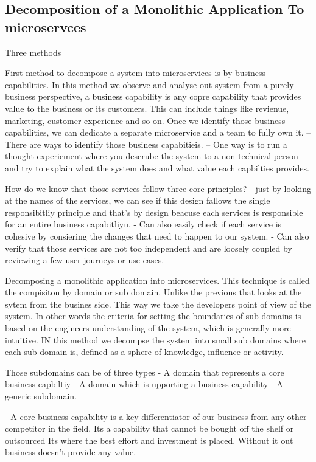 \documentclass[a4paper, 11pt]{book}
\begin{document}
{    \subsection{Decomposition of a Monolithic Application To microservces}
    Three methods

    First method to decompose a system into microservices is by business capabilities.
    In this method we observe and analyse out system from a purely business perspective, a business capability is any copre capability that provides value to the business or its customers.
    This can include things like revienue, marketing, customer experience and so on.
    Once we identify those business capabilities, we can dedicate a separate microservice and a team to fully own it.
    -- There are ways to identify those business capabitieis.
    -- One way is to run a thought experiement where you descrube the system to a non technical person and try to explain what the system does and what value each capbilties provides.

    How do we know that those services follow three core principles?
    - just by looking at the names of the services, we can see if this design fallows the single responsibitliy principle
    and that's by design beacuse each services is responsible for an entire business capabitliyu.
    - Can also easily check if each service is cohesive by consiering the changes that need to happen to our system.
    - Can also verify that those services are not too independent and are loosely coupled by reviewing a few user journeys or use cases.

    Decomposing a monolithic application into microservices.
    This technique is called the compisiton by domain or sub domain.
    Unlike the previous that looks at the sytem from the busines side.
    This way we take the developers point of view of the system.
    In other words the criteria for setting the boundaries of sub domains is based on the engineers understanding of the system, which is generally more intuitive.
    IN this method we decompse the system into small sub domains where each sub domain is, defined as a sphere of knowledge, influence or activity.

    Those subdomains can be of three types
    - A domain that represents a core business capbiltiy
    - A domain which is upporting a business capability
    - A generic subdomain.

    - A core business capability is a key differentiator of our business from any other competitor in the field.
    Its a capability that cannot be bought off the shelf or outsourced
    Its where the best effort and investment is placed.
    Without it out business doesn't provide any value.

}
\end{document}
